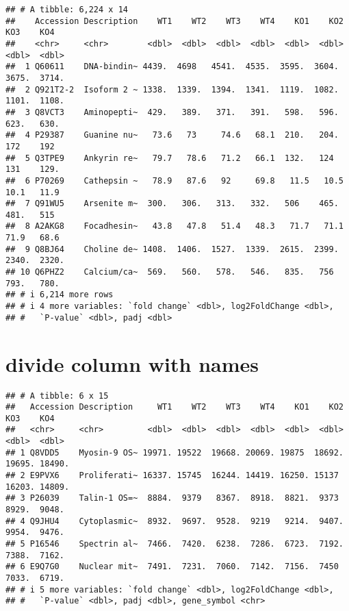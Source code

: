 \documentclass[
]{article}
\newenvironment{Shaded}{\begin{snugshade}}{\end{snugshade}}
\newcommand{\FunctionTok}[1]{\textcolor[rgb]{0.13,0.29,0.53}{\textbf{#1}}}
\newcommand{\NormalTok}[1]{#1}
\newcommand{\OtherTok}[1]{\textcolor[rgb]{0.56,0.35,0.01}{#1}}
\newcommand{\SpecialCharTok}[1]{\textcolor[rgb]{0.81,0.36,0.00}{\textbf{#1}}}
\newcommand{\StringTok}[1]{\textcolor[rgb]{0.31,0.60,0.02}{#1}}
\begin{document}
\begin{verbatim}
## # A tibble: 6,224 x 14
##    Accession Description    WT1    WT2    WT3    WT4    KO1    KO2    KO3    KO4
##    <chr>     <chr>        <dbl>  <dbl>  <dbl>  <dbl>  <dbl>  <dbl>  <dbl>  <dbl>
##  1 Q60611    DNA-bindin~ 4439.  4698   4541.  4535.  3595.  3604.  3675.  3714. 
##  2 Q921T2-2  Isoform 2 ~ 1338.  1339.  1394.  1341.  1119.  1082.  1101.  1108. 
##  3 Q8VCT3    Aminopepti~  429.   389.   371.   391.   598.   596.   623.   630. 
##  4 P29387    Guanine nu~   73.6   73     74.6   68.1  210.   204.   172    192  
##  5 Q3TPE9    Ankyrin re~   79.7   78.6   71.2   66.1  132.   124    131    129. 
##  6 P70269    Cathepsin ~   78.9   87.6   92     69.8   11.5   10.5   10.1   11.9
##  7 Q91WU5    Arsenite m~  300.   306.   313.   332.   506    465.   481.   515  
##  8 A2AKG8    Focadhesin~   43.8   47.8   51.4   48.3   71.7   71.1   71.9   68.6
##  9 Q8BJ64    Choline de~ 1408.  1406.  1527.  1339.  2615.  2399.  2340.  2320. 
## 10 Q6PHZ2    Calcium/ca~  569.   560.   578.   546.   835.   756    793.   780. 
## # i 6,214 more rows
## # i 4 more variables: `fold change` <dbl>, log2FoldChange <dbl>,
## #   `P-value` <dbl>, padj <dbl>
\end{verbatim}

\hypertarget{divide-column-with-names}{%
\section{divide column with names}\label{divide-column-with-names}}

\begin{Shaded}
\end{Shaded}

\begin{verbatim}
## # A tibble: 6 x 15
##   Accession Description     WT1    WT2    WT3    WT4    KO1    KO2    KO3    KO4
##   <chr>     <chr>         <dbl>  <dbl>  <dbl>  <dbl>  <dbl>  <dbl>  <dbl>  <dbl>
## 1 Q8VDD5    Myosin-9 OS~ 19971. 19522  19668. 20069. 19875  18692. 19695. 18490.
## 2 E9PVX6    Proliferati~ 16337. 15745  16244. 14419. 16250. 15137  16203. 14809.
## 3 P26039    Talin-1 OS=~  8884.  9379   8367.  8918.  8821.  9373   8929.  9048.
## 4 Q9JHU4    Cytoplasmic~  8932.  9697.  9528.  9219   9214.  9407.  9954.  9476.
## 5 P16546    Spectrin al~  7466.  7420.  6238.  7286.  6723.  7192.  7388.  7162.
## 6 E9Q7G0    Nuclear mit~  7491.  7231.  7060.  7142.  7156.  7450   7033.  6719.
## # i 5 more variables: `fold change` <dbl>, log2FoldChange <dbl>,
## #   `P-value` <dbl>, padj <dbl>, gene_symbol <chr>
\end{verbatim}
\end{document}
